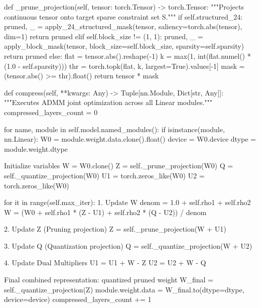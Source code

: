     def \_prune\_projection(self, tensor: torch.Tensor) -> torch.Tensor:
        """Projects continuous tensor onto target sparse constraint set S."""
        if self.structured\_24:
            pruned, \_ = apply\_24\_structured\_mask(tensor, saliency=torch.abs(tensor), dim=1)
            return pruned
        elif self.block\_size != (1, 1):
            pruned, \_ = apply\_block\_mask(tensor, block\_size=self.block\_size, sparsity=self.sparsity)
            return pruned
        else:
            flat = tensor.abs().reshape(-1)
            k = max(1, int(flat.numel() * (1.0 - self.sparsity)))
            thr = torch.topk(flat, k, largest=True).values[-1]
            mask = (tensor.abs() >= thr).float()
            return tensor * mask

    def compress(self, **kwargs: Any) -> Tuple[nn.Module, Dict[str, Any]]:
        """Executes ADMM joint optimization across all Linear modules."""
        compressed\_layers\_count = 0

        for name, module in self.model.named\_modules():
            if isinstance(module, nn.Linear):
                W0 = module.weight.data.clone().float()
                device = W0.device
                dtype = module.weight.dtype

                 Initialize variables
                W = W0.clone()
                Z = self.\_prune\_projection(W0)
                Q = self.\_quantize\_projection(W0)
                U1 = torch.zeros\_like(W0)
                U2 = torch.zeros\_like(W0)

                for it in range(self.max\_iter):
                     1. Update W
                    denom = 1.0 + self.rho1 + self.rho2
                    W = (W0 + self.rho1 * (Z - U1) + self.rho2 * (Q - U2)) / denom

                     2. Update Z (Pruning projection)
                    Z = self.\_prune\_projection(W + U1)

                     3. Update Q (Quantization projection)
                    Q = self.\_quantize\_projection(W + U2)

                     4. Update Dual Multipliers
                    U1 = U1 + W - Z
                    U2 = U2 + W - Q

                 Final combined representation: quantized pruned weight
                W\_final = self.\_quantize\_projection(Z)
                module.weight.data = W\_final.to(dtype=dtype, device=device)
                compressed\_layers\_count += 1

